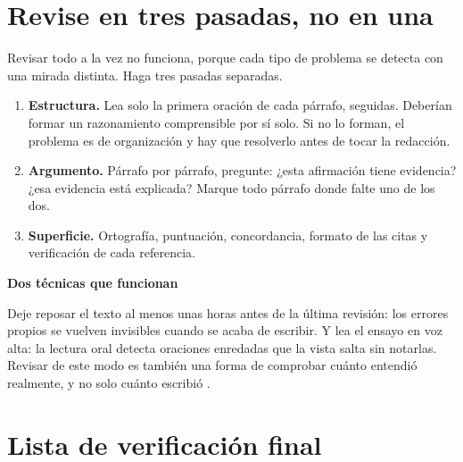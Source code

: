 \documentclass[12pt,a4paper,openany]{report}
\newenvironment{aviso}[1]
	{\begin{lrbox}{\cajaguardada}\begin{minipage}{\dimexpr\textwidth-2\fboxsep\relax}\vspace{4pt}\textbf{\sffamily\small #1}\par\vspace{3pt}\small}
	{\vspace{4pt}\end{minipage}\end{lrbox}\par\vspace{4pt}\noindent\colorbox{grisclaro}{\usebox{\cajaguardada}}\par\vspace{8pt}}
\begin{document}
\section{Revise en tres pasadas, no en una}

Revisar todo a la vez no funciona, porque cada tipo de problema se detecta con una mirada distinta. Haga tres pasadas separadas.

\begin{enumerate}[label=\textbf{Pasada \arabic*.},leftmargin=2.0cm]
	\item \textbf{Estructura.} Lea solo la primera oraci\'on de cada p\'arrafo, seguidas. Deber\'ian formar un razonamiento comprensible por s\'i solo. Si no lo forman, el problema es de organizaci\'on y hay que resolverlo antes de tocar la redacci\'on.
	\item \textbf{Argumento.} P\'arrafo por p\'arrafo, pregunte: ¿esta afirmaci\'on tiene evidencia? ¿esa evidencia est\'a explicada? Marque todo p\'arrafo donde falte uno de los dos.
	\item \textbf{Superficie.} Ortograf\'ia, puntuaci\'on, concordancia, formato de las citas y verificaci\'on de cada referencia.
\end{enumerate}

\begin{aviso}{Dos t\'ecnicas que funcionan}
Deje reposar el texto al menos unas horas antes de la \'ultima revisi\'on: los errores propios se vuelven invisibles cuando se acaba de escribir. Y lea el ensayo en voz alta: la lectura oral detecta oraciones enredadas que la vista salta sin notarlas. Revisar de este modo es tambi\'en una forma de comprobar cu\'anto entendi\'o realmente, y no solo cu\'anto escribi\'o \citep{bjork2013self}.
\end{aviso}

\section{Lista de verificaci\'on final}
\end{document}
